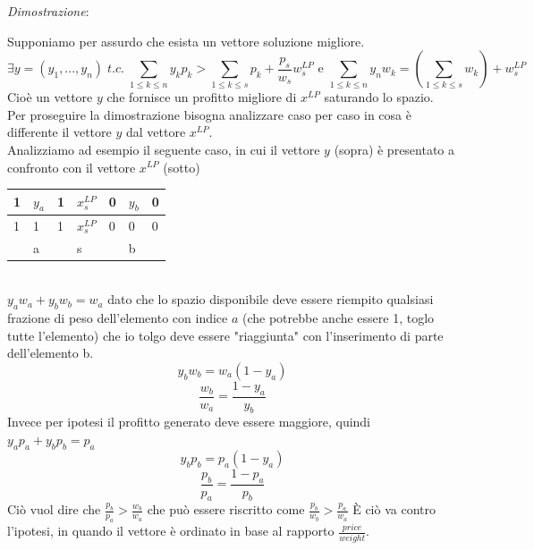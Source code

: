 \documentclass[a4paper]{article}
\newenvironment{dimostrazione}{\textit{Dimostrazione}:\begin{adjustwidth}{1cm}{}}{\end{adjustwidth}}
\begin{document}
\begin{dimostrazione}
	Supponiamo per assurdo che esista un vettore soluzione migliore.
	$$ \exists y =(y_1, ..., y_n) \; t.c. \; \sum_{1 \leq k \leq n}y_kp_k > \sum_{1 \leq k \leq s} p_k+\frac{p_s}{w_s}w_s^{LP} \text{ e }\sum_{1 \leq k \leq n}y_nw_k = (\sum_{1 \leq k \leq s}w_k)+ w_s^{LP}  $$
	Cioè un vettore $y$ che fornisce un profitto migliore di $x^{LP}$ saturando lo spazio.\\
	Per proseguire la dimostrazione bisogna analizzare caso per caso in cosa è differente il vettore $y$ dal vettore $x^{LP}$.\\
	Analizziamo ad esempio il seguente caso, in cui il vettore $y$ (sopra) è presentato a confronto con il vettore $x^{LP}$ (sotto)\\
	\begin{table}[!ht]
		\centering
\begin{tabular}{lllllll}
\hline
\multicolumn{1}{|l|}{1} & \multicolumn{1}{l|}{$y_a$} & \multicolumn{1}{l|}{1} & \multicolumn{1}{l|}{$x_s^{LP}$} & \multicolumn{1}{l|}{0} & \multicolumn{1}{l|}{$y_b$} & \multicolumn{1}{l|}{0} \\ \hline
\multicolumn{1}{|l|}{1} & \multicolumn{1}{l|}{1}    & \multicolumn{1}{l|}{1} & \multicolumn{1}{l|}{$x_s^{LP}$} & \multicolumn{1}{l|}{0} & \multicolumn{1}{l|}{0}    & \multicolumn{1}{l|}{0} \\ \hline
                        & a                         &                        & s                                                 &                        & b                         &                       
\end{tabular}
\end{table}\\
$y_aw_a +  y_bw_b = w_a$ dato che lo spazio disponibile deve essere riempito qualsiasi frazione di peso dell'elemento con indice $a$ (che potrebbe anche essere 1, toglo tutte l'elemento) che io tolgo deve essere "riaggiunta" con l'inserimento di parte dell'elemento b.
$$y_bw_b=w_a(1-y_a)$$
$$\frac{w_b}{w_a}=\frac{1-y_a}{y_b}$$
Invece per ipotesi il profitto generato deve essere maggiore, quindi $y_ap_a +  y_bp_b = p_a$
$$y_bp_b=p_a(1-y_a)$$
$$\frac{p_b}{p_a}=\frac{1-p_a}{p_b}$$
Ciò vuol dire che $\frac{p_b}{p_a} > \frac{w_b}{w_a}$ che può essere riscritto come $\frac{p_b}{w_b} > \frac{p_a}{w_a}$%
È ciò va contro l'ipotesi, in quando il vettore è ordinato in base al rapporto $\frac{price}{weight}$.
\end{dimostrazione}
\end{document}
